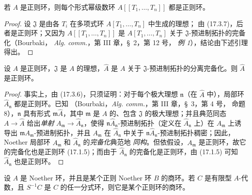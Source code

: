 \begin{corollary}[17.3.8]
\label{0.17.3.8-fr}
若 $A$ 是正则环，则每个形式幂级数环
$A[[T_1,\ldots,T_n]]$ 都是正则环。
\end{corollary}

\begin{proof}
设 $\mathfrak{J}$ 是由各 $T_i$ 在多项式环 $A[T_1,\ldots,T_n]$ 中生成的理想；
由 (17.3.7)，后者是正则环；又因为 $A[[T_1,\ldots,T_n]]$ 是
$A[T_1,\ldots,T_n]$ 关于 $\mathfrak{J}$-预进制拓扑的完备化（Bourbaki，
\emph{Alg. comm.}，第 III 章，\S~2，第 12 号，
\emph{例 1}），结论由下述引理得出。
\end{proof}

\begin{lemma}[17.3.8.1]
\label{0.17.3.8.1-fr}
设 $A$ 是正则环，$\mathfrak{J}$ 是 $A$ 的理想，$\widehat{A}$ 是 $A$ 关于
$\mathfrak{J}$-预进制拓扑的分离完备化。则 $\widehat{A}$ 是正则环。
\end{lemma}

\begin{proof}
事实上，由 (17.3.6)，只须证明：对于每个极大理想 $\mathfrak{n}$（在
$\widehat{A}$ 中），局部环 $\widehat{A}_{\mathfrak{n}}$ 都是正则环。已知
（Bourbaki，\emph{Alg. comm.}，第 III 章，\S~3，第 4 号，
命题 8），$\mathfrak{n}$
具有形式 $\mathfrak{m}\widehat{A}$，其中 $\mathfrak{m}$ 是 $A$ 的、包含
$\mathfrak{J}$ 的极大理想；并且典范同态 $A\to\widehat{A}$ 给出\emph{单射}
$A_{\mathfrak{m}}\to\widehat{A}_{\mathfrak{n}}$，使得
$\mathfrak{n}\widehat{A}_{\mathfrak{n}}$-预进制拓扑（定义在
$\widehat{A}_{\mathfrak{n}}$ 上）在
$A_{\mathfrak{m}}$ 上诱导出
$\mathfrak{m}A_{\mathfrak{m}}$-预进制拓扑，并且 $A_{\mathfrak{m}}$ 在
$\widehat{A}_{\mathfrak{n}}$ 中关于
$\mathfrak{n}\widehat{A}_{\mathfrak{n}}$-预进制拓扑稠密；因此，Noether 局部环
$A_{\mathfrak{m}}$ 和 $\widehat{A}_{\mathfrak{n}}$ 的\emph{完备化}典范地
\emph{同构}。但依假设，$A_{\mathfrak{m}}$ 是正则环，故它的完备化也是正则环
(17.1.5)；而由于 $\widehat{A}_{\mathfrak{n}}$ 的完备化是正则环，由
(17.1.5) 可知 $\widehat{A}_{\mathfrak{n}}$ 也是正则环。
\end{proof}

\begin{corollary}[17.3.9]
\label{0.17.3.9-fr}
设 $A$ 是 Noether 环，并且是某个正则 Noether 环 $B$ 的商环。若 $C$ 是有限型
$A$-代数，且 $S^{-1}C$ 是 $C$ 的任一分式环，则它是某个正则环的商环。
\end{corollary}

